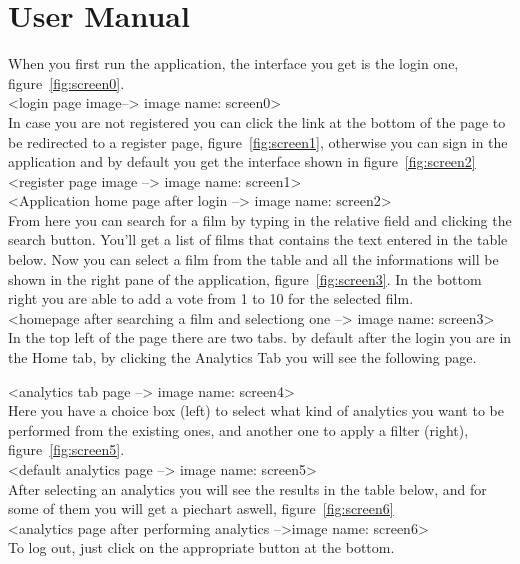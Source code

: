 \documentclass[a4paper, oneside]{article}
\begin{document}
\clearpage
\section{User Manual}
When you first run the application, the interface you get is the login one, figure~\ref{fig:screen0}. \\

<login page image--> image name: screen0>\\

In case you are not registered you can click the link at the bottom of the page to be redirected to a register page, figure~\ref{fig:screen1}, otherwise you can sign in the application and by default you get the interface shown in figure~\ref{fig:screen2}\\

<register page image --> image name: screen1>\\

<Application home page after login --> image name: screen2> \\

From here you can search for a film by typing in the relative field and clicking the search button. You'll get a list of films that contains the text entered in the table below. Now you can select a film from the table and all the informations will be shown in the right pane of the application, figure~\ref{fig:screen3}. In the bottom right you are able to add a vote from 1 to 10 for the selected film.\\

<homepage after searching a film and selectiong one --> image name: screen3>\\

In the top left of the page there are two tabs. by default after the login you are in the Home tab, by clicking the Analytics Tab you will see the following page.

<analytics tab page --> image name: screen4>\\

Here you have a choice box (left) to select what kind of analytics you want to be performed from the existing ones, and another one to apply a filter (right), figure~\ref{fig:screen5}. \\

<default analytics page --> image name: screen5>\\

After selecting an analytics you will see the results in the table below, and for some of them you will get a piechart aswell, figure~\ref{fig:screen6}\\

<analytics page after performing analytics -->image name: screen6>\\

To log out, just click on the appropriate button at the bottom.
\end{document}
